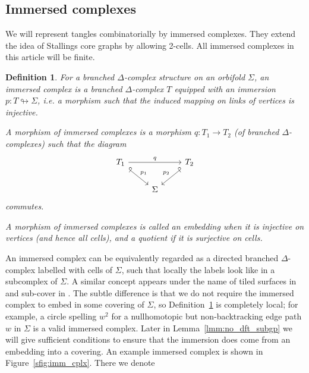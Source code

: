 \documentclass{amsart}
\newtheorem{definition}[conjecture]{Definition}
\begin{document}
\subsection{Immersed complexes}\label{ssec:imm_cplx}

We will represent tangles combinatorially by immersed complexes. They extend the idea of Stallings core graphs \cite{topology_finite_graphs_Stallings83} by allowing 2-cells. All immersed complexes in this article will be finite.
\begin{definition}\label{def:imm_cplx}
For a branched $\Delta$-complex structure on an orbifold $\Sigma$, an \emph{immersed complex} is a branched $\Delta$-complex $T$ equipped with an immersion $p\colon T\looparrowright\Sigma$, i.e. a morphism such that the induced mapping on links of vertices is injective.

A \emph{morphism of immersed complexes} is a morphism $q\colon T_1\to T_2$ (of branched $\Delta$-complexes) such that the diagram
\begin{equation*}\begin{tikzcd}
T_1\arrow[rr,"q"]\arrow[rd,"p_1",{Glyph[glyph math command=looparrowleft, swap]}->]&&T_2\arrow[ld,"p_2"',{Glyph[glyph math command=looparrowleft]}->]\\
&\Sigma&
\end{tikzcd}\end{equation*}
commutes.

A morphism of immersed complexes is called an \emph{embedding} when it is injective on vertices (and hence all cells), and a \emph{quotient} if it is surjective on cells.
\end{definition}
An immersed complex can be equivalently regarded as a directed branched $\Delta$-complex labelled with cells of $\Sigma$, such that locally the labels look like in a subcomplex of $\Sigma$. A similar concept appears under the name of tiled surfaces in \cite[Definition 2.1]{asymptotic_stats_random_covering_surfaces_MageePuder23} and sub-cover in \cite[Definition 2.1]{local_stats_random_perms_free_prods_PuderZimhoni24}. The subtle difference is that we do not require the immersed complex to embed in some covering of $\Sigma$, so Definition~\ref{def:imm_cplx} is completely local; for example, a circle spelling $w^2$ for a nullhomotopic but non-backtracking edge path $w$ in $\Sigma$ is a valid immersed complex. Later in Lemma~\ref{lmm:no_dft_subgp} we will give sufficient conditions to ensure that the immersion does come from an embedding into a covering. An example immersed complex is shown in Figure~\ref{sfig:imm_cplx}. There we denote
\end{document}
